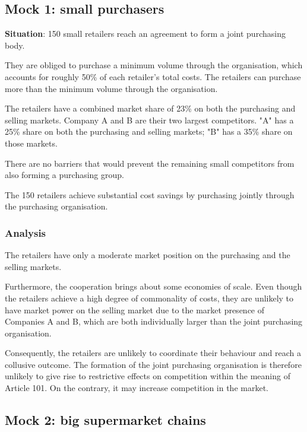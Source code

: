     \subsection{Mock 1: small purchasers}

        \textbf{Situation}: 150 small retailers reach an agreement to form a joint purchasing body.

        They are obliged to purchase a minimum volume through the organisation, which accounts for roughly 50\% of each retailer’s total costs. The retailers can purchase more than the minimum volume through the organisation.
        
        The retailers have a combined market share of 23\% on both the purchasing and selling markets. Company A and B are their two largest competitors. "A" has a 25\% share on both the purchasing and selling markets; "B" has a 35\% share on those markets.
        
        There are no barriers that would prevent the remaining small competitors from also forming a purchasing group.
        
        The 150 retailers achieve substantial cost savings by purchasing jointly through the purchasing organisation.

        \subsubsection{Analysis}

            The retailers have only a moderate market position on the purchasing and the selling markets.  
            
            Furthermore, the cooperation brings about some economies of scale.  
            Even though the retailers achieve a high degree of commonality of costs, they are unlikely to have market power on the selling market due to the market presence of Companies A and B, which are both individually larger than the joint purchasing organisation.
            
            Consequently, the retailers are unlikely to coordinate their behaviour and reach a collusive outcome.  
            The formation of the joint purchasing organisation is therefore unlikely to give rise to restrictive effects on competition within the meaning of Article 101. On the contrary, it may increase competition in the market.

        \subsection{Mock 2: big supermarket chains}

